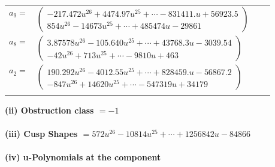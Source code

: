 \documentclass[1p]{elsarticle_modified}
\theoremstyle{definition}
\begin{document}
\begin{tabular}{m{7pt} m{180pt} m{7pt} m{180pt} }
\flushright $a_{9}=$&$\begin{pmatrix}-217.472 u^{26}+4474.97 u^{25}+\cdots-831411. u+56923.5\\854 u^{26}-14673 u^{25}+\cdots+485474 u-29861\end{pmatrix}$ \\
\flushright $a_{8}=$&$\begin{pmatrix}3.87578 u^{26}-105.640 u^{25}+\cdots+43768.3 u-3039.54\\-42 u^{26}+713 u^{25}+\cdots-9810 u+463\end{pmatrix}$ \\
\flushright $a_{2}=$&$\begin{pmatrix}190.292 u^{26}-4012.55 u^{25}+\cdots+828459. u-56867.2\\-847 u^{26}+14620 u^{25}+\cdots-547319 u+34179\end{pmatrix}$\\&\end{tabular}
\flushleft \textbf{(ii) Obstruction class $= -1$}\\~\\
\flushleft \textbf{(iii) Cusp Shapes $= 572 u^{26}-10814 u^{25}+\cdots+1256842 u-84866$}\\~\\
\newpage\renewcommand{\arraystretch}{1}
\flushleft \textbf{(iv) u-Polynomials at the component}\newline \\
\end{document}
